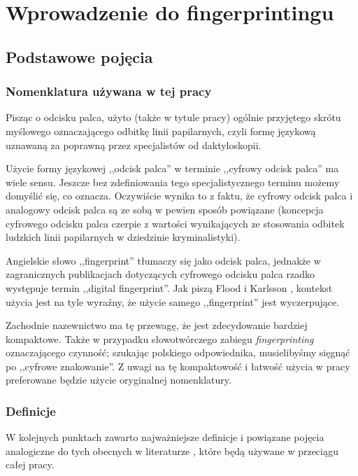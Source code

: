 \chapter{Wprowadzenie do fingerprintingu}

\section{Podstawowe pojęcia}

\subsection{Nomenklatura używana w tej pracy}
Pisząc o odcisku palca, użyto (także w tytule pracy) ogólnie przyjętego skrótu
myślowego oznaczającego odbitkę linii papilarnych, czyli formę językową uznawaną
za poprawną przez specjalistów od daktyloskopii.

Użycie formy językowej ,,odcisk palca'' w terminie ,,cyfrowy odcisk palca'' ma
wiele sensu. Jeszcze bez zdefiniowania tego specjalistycznego terminu możemy
domyślić się, co oznacza. Oczywiście wynika to z faktu, że cyfrowy odcisk palca
i analogowy odcisk palca są ze sobą w pewien sposób powiązane (koncepcja
cyfrowego odcisku palca czerpie z wartości wynikających ze stosowania odbitek
ludzkich linii papilarnych w dziedzinie kryminalistyki).

Angielskie słowo ,,fingerprint'' tłumaczy się jako odcisk palca, jednakże w
zagranicznych publikacjach dotyczących cyfrowego odcisku palca rzadko występuje
termin ,,digital fingerprint''. Jak piszą Flood i Karlsson \cite[s.
4]{flood2012browser}, kontekst użycia jest na tyle wyraźny, że użycie samego
,,fingerprint'' jest wyczerpujące.

Zachodnie nazewnictwo ma tę przewagę, że jest zdecydowanie bardziej kompaktowe.
Także w przypadku słowotwórczego zabiegu \emph{fingerprinting} oznaczającego
czynność; szukając polskiego odpowiednika, musielibyśmy sięgnąć po ,,cyfrowe
znakowanie''. Z uwagi na tę kompaktowość i łatwość użycia w pracy preferowane
będzie użycie oryginalnej nomenklatury.

\subsection{Definicje}
W kolejnych punktach zawarto najważniejsze definicje i powiązane pojęcia
analogiczne do tych obecnych w literaturze
\cite{eckersley2010unique,flood2012browser}, które będą używane w przeciągu
całej pracy.

